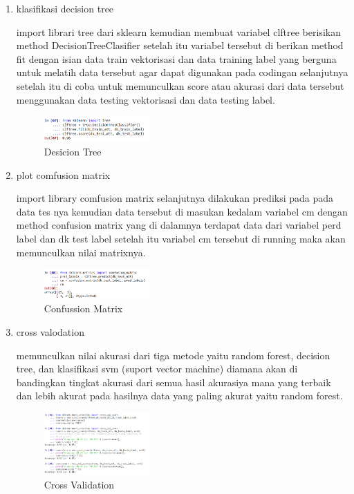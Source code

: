 \begin{enumerate}
        \item klasifikasi decision tree \hfill \break 
        
        import librari tree dari sklearn kemudian membuat variabel clftree berisikan method DecisionTreeClasifier setelah itu variabel tersebut di berikan method fit dengan isian data train vektorisasi dan data training label yang berguna untuk melatih data tersebut agar dapat digunakan pada codingan selanjutnya setelah itu di coba untuk memunculkan score atau akurasi dari data tersebut menggunakan data testing vektorisasi dan data testing label.
        \begin{figure}[H]
            \includegraphics[width=4cm]{figures/1174040/chapter4/5.png}
            \centering
            \caption{Desicion Tree}
        \end{figure}

        \item plot comfusion matrix \hfill \break 
        
        import library comfusion matrix selanjutnya dilakukan prediksi pada pada data tes nya kemudian data tersebut di masukan kedalam variabel cm dengan method confusion matrix yang di dalamnya terdapat data dari variabel perd label dan dk test label setelah itu variabel cm tersebut di running maka akan memunculkan nilai matrixnya. 
        \begin{figure}[H]
            \includegraphics[width=4cm]{figures/1174040/chapter4/6.png}
            \centering
            \caption{Confussion Matrix}
        \end{figure}

        \item cross valodation \hfill \break 
        
        memunculkan nilai akurasi dari tiga metode yaitu random forest, decision tree, dan klasifikasi svm (suport vector machine) diamana akan di bandingkan tingkat akurasi dari semua hasil akurasiya mana yang terbaik dan lebih akurat pada hasilnya data yang paling akurat yaitu random forest.
        \begin{figure}[H]
            \includegraphics[width=4cm]{figures/1174040/chapter4/7.png}
            \centering
            \caption{Cross Validation}
        \end{figure}


\end{enumerate}
